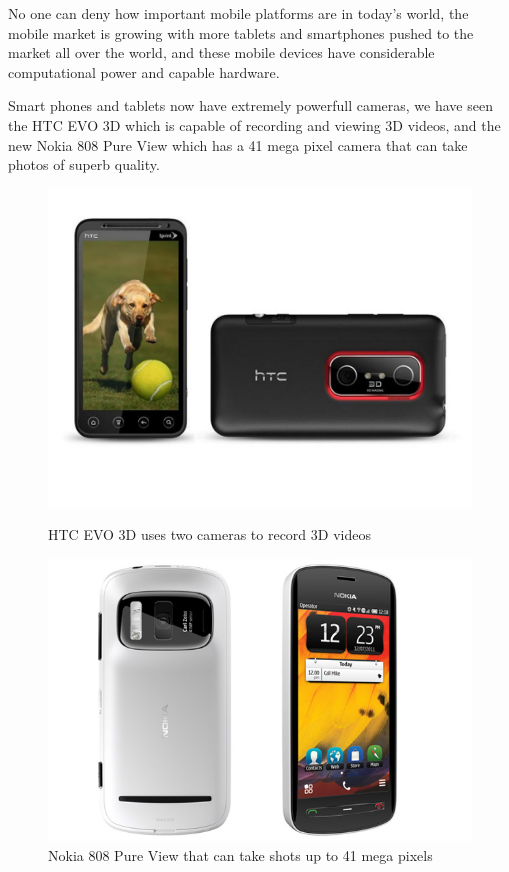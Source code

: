 No one can deny how important mobile platforms are in today's world, the mobile market is growing with more tablets and smartphones pushed to the market all over the world, and these mobile devices have considerable computational power and capable hardware.

Smart phones and tablets now have extremely powerfull cameras, we have seen the HTC EVO 3D which is capable of recording and viewing 3D videos, and the new Nokia 808 Pure View which has a 41 mega pixel camera that can take photos of superb quality.

\begin{figure}[H]
\begin{minipage}[b]{0.5\linewidth}
\centering
\includegraphics[scale=0.2,keepaspectratio=true]{Conclusions_and_Future/htc_evo.jpg}
\caption{HTC EVO 3D uses two cameras to record 3D videos}
\label{fig:kinect_windows}
\end{minipage}
\hspace{0.5cm}
\begin{minipage}[b]{0.5\linewidth}
\centering
\includegraphics[scale=0.3,keepaspectratio=true]{Conclusions_and_Future/Nokia_808_PureView.jpg}
\caption{Nokia 808 Pure View that can take shots up to 41 mega pixels}
\label{fig:kinect_xbox}
\end{minipage}
\end{figure}

